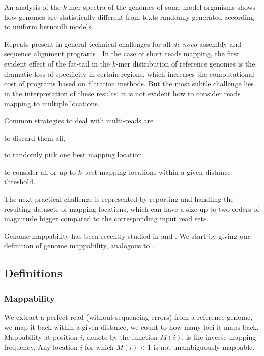 An analysis of the $k$-mer spectra of the genomes of some model organisms shows how genomes are statistically different from texts randomly generated according to uniform bernoulli models.

Repeats present in general technical challenges for all \emph{de novo} assembly and sequence alignment programs \citep{Lee2012}.
In the case of short reads mapping, the first evident effect of the fat-tail in the $k$-mer distribution of reference genomes is the dramatic loss of specificity in certain regions, which increases the computational cost of programs based on filtration methods.
But the most subtle challenge lies in the interpretation of these results: it is not evident how to consider reads mapping to multiple locations.

Common strategies to deal with multi-reads are
\begin{inparaenum}[(i)]
\item to discard them all,
\item to randomly pick one best mapping location,
\item to consider all or up to $k$ best mapping locations within a given distance threshold.
\end{inparaenum}

The next practical challenge is represented by reporting and handling the resulting datasets of mapping locations, which can have a size up to two orders of magnitude bigger compared to the corresponding input read sets.

Genome mappability has been recently studied in \citep{Derrien2012} and \citep{Lee2012}.
We start by giving our definition of genome mappability, analogous to \citep{Derrien2012}.




\subsection{Definitions}

\subsubsection{Mappability}

We extract a perfect read (without sequencing errors) from a reference genome, we map it back within a given distance, we count to how many loci it maps back.
Mappability at position $i$, denote by the function $M(i)$, is the inverse mapping frequency.
Any location $i$ for which $M(i) < 1$ is not unambiguously mappable.

